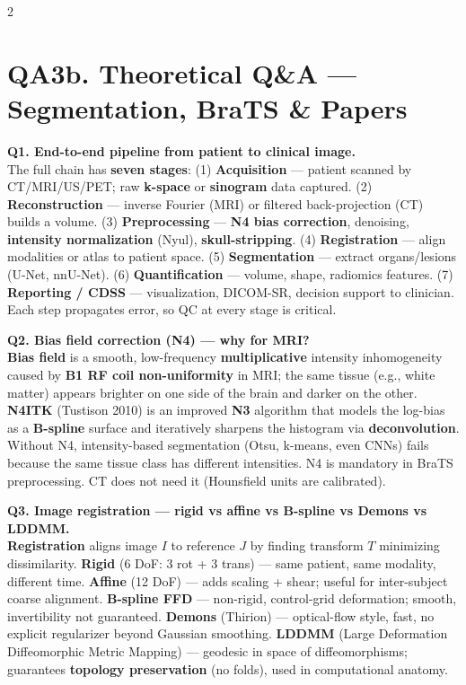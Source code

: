 \begin{paracol}{2}
\section*{QA3b. Theoretical Q\&A — Segmentation, BraTS \& Papers}

\textbf{Q1. End-to-end pipeline from patient to clinical image.}\\
The full chain has \textbf{seven stages}: (1) \textbf{Acquisition} — patient scanned by CT/MRI/US/PET; raw \textbf{k-space} or \textbf{sinogram} data captured. (2) \textbf{Reconstruction} — inverse Fourier (MRI) or filtered back-projection (CT) builds a volume. (3) \textbf{Preprocessing} — \textbf{N4 bias correction}, denoising, \textbf{intensity normalization} (Nyul), \textbf{skull-stripping}. (4) \textbf{Registration} — align modalities or atlas to patient space. (5) \textbf{Segmentation} — extract organs/lesions (U-Net, nnU-Net). (6) \textbf{Quantification} — volume, shape, radiomics features. (7) \textbf{Reporting / CDSS} — visualization, DICOM-SR, decision support to clinician. Each step propagates error, so QC at every stage is critical.

\textbf{Q2. Bias field correction (N4) — why for MRI?}\\
\textbf{Bias field} is a smooth, low-frequency \textbf{multiplicative} intensity inhomogeneity caused by \textbf{B1 RF coil non-uniformity} in MRI; the same tissue (e.g., white matter) appears brighter on one side of the brain and darker on the other. \textbf{N4ITK} (Tustison 2010) is an improved \textbf{N3} algorithm that models the log-bias as a \textbf{B-spline} surface and iteratively sharpens the histogram via \textbf{deconvolution}. Without N4, intensity-based segmentation (Otsu, k-means, even CNNs) fails because the same tissue class has different intensities. N4 is mandatory in BraTS preprocessing. CT does not need it (Hounsfield units are calibrated).

\textbf{Q3. Image registration — rigid vs affine vs B-spline vs Demons vs LDDMM.}\\
\textbf{Registration} aligns image $I$ to reference $J$ by finding transform $T$ minimizing dissimilarity. \textbf{Rigid} (6 DoF: 3 rot + 3 trans) — same patient, same modality, different time. \textbf{Affine} (12 DoF) — adds scaling + shear; useful for inter-subject coarse alignment. \textbf{B-spline FFD} — non-rigid, control-grid deformation; smooth, invertibility not guaranteed. \textbf{Demons} (Thirion) — optical-flow style, fast, no explicit regularizer beyond Gaussian smoothing. \textbf{LDDMM} (Large Deformation Diffeomorphic Metric Mapping) — geodesic in space of diffeomorphisms; guarantees \textbf{topology preservation} (no folds), used in computational anatomy.


\end{paracol}
